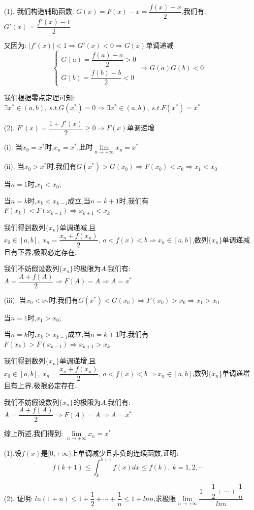 \begin{solution}
	
	(1). 我们构造辅助函数:  $G(x)=F(x)-x=\dfrac{f(x)-x}{2}$,我们有:  $G'(x)=\dfrac{f'(x)-1}{2}$
	
	又因为:  $|f'(x)|<1\Rightarrow G'(x)<0\Rightarrow G(x)\text{单调递减}$
	$$\left\lbrace
	\begin{array}{l}
		G(a)=\dfrac{f(a)-a}{2}>0\\
		G(b)=\dfrac{f(b)-b}{2}<0
	\end{array}
	\right. \Rightarrow G(a)G(b)<0$$
	
	我们根据零点定理可知:  $\exists x^{*}\in(a,b),\ s.t. G(x^{*})=0\Rightarrow \exists x^{*}\in(a,b),\ s.t. F(x^{*})=x^{*}$
	
	(2). 
	$F'(x)=\dfrac{1+f'(x)}{2}\geq 0\Rightarrow F(x)\text{单调递增}$
	
	(i). 当$x_{0}=x^{*}$时,$x_{n}=x^{*}$,此时$\lim\limits_{n\rightarrow +\infty}x_{n}=x^{*}$
	
	(ii). 当$x_{0}>x^{*}$时,我们有$G(x^{*})>G(x_{0})\Rightarrow F(x_{0})<x_{0}\Rightarrow x_{1}<x_{0}$
	
	当$n=1$时,$x_{1}<x_{0}$;
	
	当$n=k$时,$x_{k}<x_{k-1}$成立,当$n=k+1$时,我们有$F(x_{k})<F(x_{k-1})\Rightarrow x_{k+1}<x_{k}$
	
	我们得到数列$\{x_{n}\}$单调递减,且$x_{0}\in[a,b],\ x_{n}=\dfrac{x_{n}+f(x_{n})}{2},\ a<f(x)<b\Rightarrow x_{n}\in[a,b]$,数列$\{x_{n}\}$单调递减且有下界,极限必定存在.
	
	我们不妨假设数列$\{x_{n}\}$的极限为$A$,我们有:  $A=\dfrac{A+f(A)}{2}\Rightarrow F(A)=A\Rightarrow A=x^{*}$
	
	(iii). 当$x_{0}<x_{*}$时,我们有$G(x^{*})<G(x_{0})\Rightarrow F(x_{0})>x_{0}\Rightarrow x_{1}>x_{0}$
	
	当$n=1$时,$x_{1}>x_{0}$;
	
	当$n=k$时,$x_{k}>x_{k-1}$成立,当$n=k+1$时,我们有$F(x_{k})>F(x_{k-1})\Rightarrow x_{k+1}>x_{k}$
	
	我们得到数列$\{x_{n}\}$单调递增,且$x_{0}\in[a,b],\ x_{n}=\dfrac{x_{n}+f(x_{n})}{2},\ a<f(x)<b\Rightarrow x_{n}\in[a,b]$,数列$\{x_{n}\}$单调递增且有上界,极限必定存在.
	
	我们不妨假设数列$\{x_{n}\}$的极限为$A$,我们有:  $A=\dfrac{A+f(A)}{2}\Rightarrow F(A)=A\Rightarrow A=x^{*}$
	
	综上所述,我们得到:  $\lim\limits_{n\rightarrow+\infty}x_{n}=x^{*}$
\end{solution}
\begin{proposition}
(1).设$f(x)$是$[0,+\infty)$上单调减少且非负的连续函数,证明:  $$f(k+1)\leq \int_{k}^{k+1}f(x)dx\leq f(k),\ k=1,2,\cdots$$

(2). 证明:  $ln(1+n)\leq 1+\dfrac{1}{2}+\cdots+\dfrac{1}{n}\leq 1+ln n$,求极限$\lim\limits_{n\rightarrow+\infty}\dfrac{1+\dfrac{1}{2}+\cdots+\dfrac{1}{n}}{ln n}$

\end{proposition}
